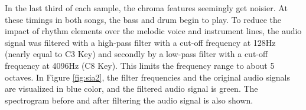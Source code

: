 \noindent In the last third of each sample, the chroma features seemingly get noisier. At these timings in both songs, the bass and drum begin to play. To reduce the impact of rhythm elements over the melodic voice and instrument lines, the audio signal was filtered with a high-pass filter with a cut-off frequency at 128Hz (nearly equal to C3 Key) and secondly by a low-pass filter with a cut-off frequency at 4096Hz (C8 Key). This limits the frequency range to about 5 octaves. 
In Figure \ref{fig:sia2}, the filter frequencies and the original audio signals are visualized in blue color, and the filtered audio signal is green. The spectrogram before and after filtering the audio signal is also shown. 
\begin{figure}[htbp]
	\centering
\end{figure}
